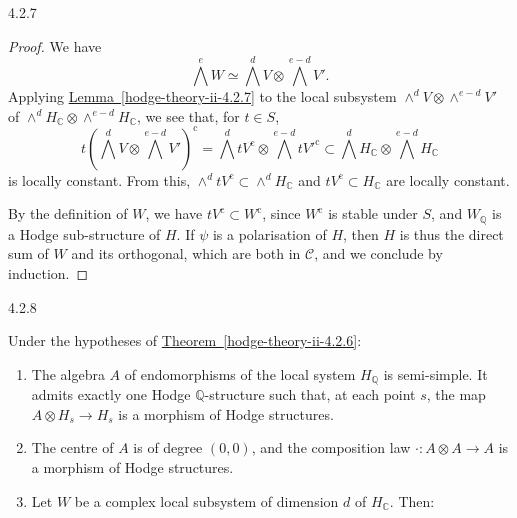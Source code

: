 \begin{lemma}{4.2.7}
\begin{proof}
      We have
      \[         \bigwedge ^e W         \simeq  \bigwedge ^d V\otimes \bigwedge ^{e-d}V'.       \]
      Applying \hyperref[hodge-theory-ii-4.2.7]{Lemma~\ref*{hodge-theory-ii-4.2.7}} to the local subsystem \(\wedge ^d V\otimes \wedge ^{e-d}V'\) of \(\wedge ^d H_\mathbb {C}\otimes \wedge ^{e-d}H_\mathbb {C}\), we see that, for \(t\in  S\),
      \[         t\left (\bigwedge ^d V\otimes \bigwedge ^{e-d}V'\right )^\mathrm {c}         = \bigwedge ^d tV^\mathrm {c}\otimes \bigwedge ^{e-d}t{V'}^\mathrm {c}         \subset  \bigwedge ^d H_\mathbb {C}\otimes \bigwedge ^{e-d}H_\mathbb {C}       \]
      is locally constant.
      From this, \(\wedge ^d tV^\mathrm {c}\subset \wedge ^d H_\mathbb {C}\) and \(tV^\mathrm {c}\subset  H_\mathbb {C}\) are locally constant.\par{}By the definition of \(W\), we have \(tV^\mathrm {c}\subset  W^\mathrm {c}\), since \(W^\mathrm {c}\) is stable under \(S\), and \(W_\mathbb {Q}\) is a Hodge sub-structure of \(H\).
      If \(\psi \) is a polarisation of \(H\), then \(H\) is thus the direct sum of \(W\) and its orthogonal, which are both in \(\mathcal {C}\), and we conclude by induction.\end{proof}\end{lemma}\begin{corollary}{4.2.8}\label{hodge-theory-ii-4.2.8}\skipsinglepar\par{}Under the hypotheses of \hyperref[hodge-theory-ii-4.2.6]{Theorem~\ref*{hodge-theory-ii-4.2.6}}:\begin{enumerate}
    
 \item[(i)]
      The algebra \(A\) of endomorphisms of the local system \(H_\mathbb {Q}\) is semi-simple.
      It admits exactly one Hodge \(\mathbb {Q}\)-structure such that, at each point \(s\), the map \(A\otimes  H_s\to  H_s\) is a morphism of Hodge structures.
    


    
 \item[(ii)]
      
      The centre of \(A\) is of degree \((0,0)\), and the composition law \(\cdot \colon  A\otimes  A\to  A\) is a morphism of Hodge structures.
    


    
 \item[(iii)]
      Let \(W\) be a complex local subsystem of dimension \(d\) of \(H_\mathbb {C}\).
      Then:

      
 \begin{enumerate}
        

\end{enumerate}
\end{enumerate}
\end{corollary}
